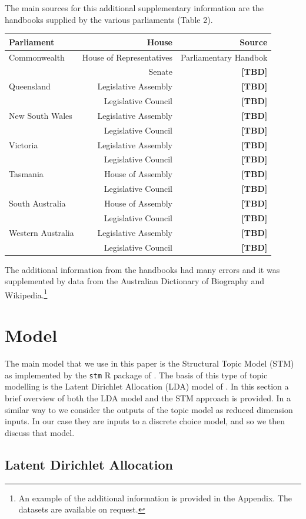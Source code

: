 \documentclass[12pt,]{article}
\theoremstyle{definition}
\theoremstyle{definition}
\theoremstyle{definition}
\theoremstyle{remark}
\begin{document}
The main sources for this additional supplementary information are the
handbooks supplied by the various parliaments (Table 2).

\begin{longtable}[]{@{}lrr@{}}
\toprule
Parliament & House & Source\tabularnewline
\midrule
\endhead
Commonwealth & House of Representatives & Parliamentary
Handbok\tabularnewline
& Senate & \textbf{{[}TBD{]}}\tabularnewline
Queensland & Legislative Assembly & \textbf{{[}TBD{]}}\tabularnewline
& Legislative Council & \textbf{{[}TBD{]}}\tabularnewline
New South Wales & Legislative Assembly &
\textbf{{[}TBD{]}}\tabularnewline
& Legislative Council & \textbf{{[}TBD{]}}\tabularnewline
Victoria & Legislative Assembly & \textbf{{[}TBD{]}}\tabularnewline
& Legislative Council & \textbf{{[}TBD{]}}\tabularnewline
Tasmania & House of Assembly & \textbf{{[}TBD{]}}\tabularnewline
& Legislative Council & \textbf{{[}TBD{]}}\tabularnewline
South Australia & House of Assembly & \textbf{{[}TBD{]}}\tabularnewline
& Legislative Council & \textbf{{[}TBD{]}}\tabularnewline
Western Australia & Legislative Assembly &
\textbf{{[}TBD{]}}\tabularnewline
& Legislative Council & \textbf{{[}TBD{]}}\tabularnewline
\bottomrule
\end{longtable}

The additional information from the handbooks had many errors and it was
supplemented by data from the Australian Dictionary of Biography and
Wikipedia.\footnote{An example of the additional information is provided
  in the Appendix. The datasets are available on request.}

\section{Model}\label{model}

The main model that we use in this paper is the Structural Topic Model
(STM) as implemented by the \texttt{stm} R package of
\citet{RobertsStewartAiroldiRPackage}. The basis of this type of topic
modelling is the Latent Dirichlet Allocation (LDA) model of
\citet{Blei2003latent}. In this section a brief overview of both the LDA
model and the STM approach is provided. In a similar way to
\citet{MuellerRauh2018} we consider the outputs of the topic model as
reduced dimension inputs. In our case they are inputs to a discrete
choice model, and so we then discuss that model.

\subsection{Latent Dirichlet
Allocation}\label{latent-dirichlet-allocation}
\end{document}
